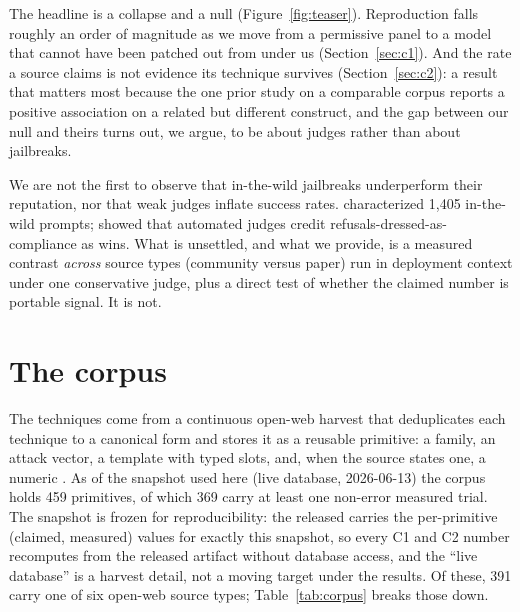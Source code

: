 \documentclass[letterpaper,twocolumn,10pt]{article}
\begin{document}
The headline is a collapse and a null (Figure~\ref{fig:teaser}). Reproduction falls roughly an order of magnitude as we move from a permissive panel to a model that cannot have been patched out from under us (Section~\ref{sec:c1}). And the rate a source claims is not evidence its technique survives (Section~\ref{sec:c2}): a result that matters most because the one prior study on a comparable corpus reports a positive association on a related but different construct, and the gap between our null and theirs turns out, we argue, to be about judges rather than about jailbreaks.

We are not the first to observe that in-the-wild jailbreaks underperform their reputation, nor that weak judges inflate success rates. \citet{shen2024doanythingnow} characterized 1{,}405 in-the-wild prompts; \citet{souly2024strongreject} showed that automated judges credit refusals-dressed-as-compliance as wins. What is unsettled, and what we provide, is a measured contrast \emph{across} source types (community versus paper) run in deployment context under one conservative judge, plus a direct test of whether the claimed number is portable signal. It is not.

\section{The corpus}
\label{sec:corpus}

The techniques come from a continuous open-web harvest that deduplicates each technique to a canonical form and stores it as a reusable primitive: a family, an attack vector, a template with typed slots, and, when the source states one, a numeric . As of the snapshot used here (live database, 2026-06-13) the corpus holds 459 primitives, of which 369 carry at least one non-error measured trial. The snapshot is frozen for reproducibility: the released  carries the per-primitive (claimed, measured) values for exactly this snapshot, so every C1 and C2 number recomputes from the released artifact without database access, and the ``live database'' is a harvest detail, not a moving target under the results. Of these, 391 carry one of six open-web source types; Table~\ref{tab:corpus} breaks those down.
\end{document}
